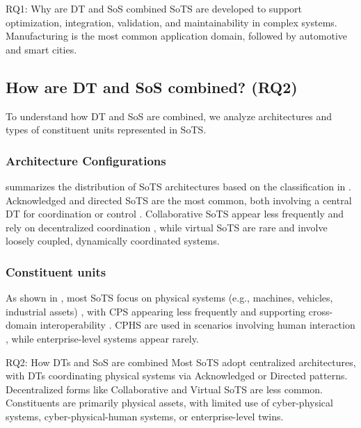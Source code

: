 \begin{conclusionframe}{RQ1: Why are DT and SoS combined}
SoTS are developed to support optimization, integration, validation, and maintainability in complex systems. Manufacturing is the most common application domain, followed by automotive and smart cities.
\end{conclusionframe}

\subsection{How are DT and SoS combined? (RQ2)}\label{results-rq2}
To understand how DT and SoS are combined, we analyze architectures and types of constituent units represented in SoTS.

\subsubsection{Architecture Configurations}\label{sec:literature-review-architecture}

 summarizes the distribution of SoTS architectures based on the classification in . Acknowledged and directed SoTS are the most common, both involving a central DT for coordination or control \cite{li2022cognitive, monsalve2021novel, reiche2021digital, li2024comprehensive}. Collaborative SoTS appear less frequently and rely on decentralized coordination \cite{vogel-heuser2021approach, chen2018digital}, while virtual SoTS are rare and involve loosely coupled, dynamically coordinated systems.

\subsubsection{Constituent units}\label{sec:constituents}

As shown in , most SoTS focus on physical systems (e.g., machines, vehicles, industrial assets) \cite{reiche2021digital, kruger2022towards}, with CPS appearing less frequently and supporting cross-domain interoperability \cite{marah2023architecture}. CPHS are used in scenarios involving human interaction \cite{savur2019hrc-sos}, while enterprise-level systems appear rarely.

\begin{conclusionframe}{RQ2: How DTs and SoS are combined}
Most SoTS adopt centralized architectures, with DTs coordinating physical systems via Acknowledged or Directed patterns. Decentralized forms like Collaborative and Virtual SoTS are less common. Constituents are primarily physical assets, with limited use of cyber-physical systems, cyber-physical-human systems, or enterprise-level twins.
\end{conclusionframe}

